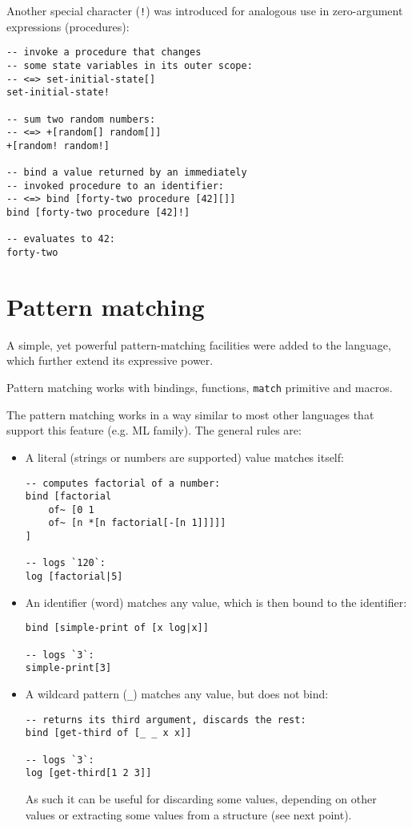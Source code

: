 Another special character (\texttt{!}) was introduced for analogous use in
zero-argument expressions (procedures):
\begin{lstlisting}
-- invoke a procedure that changes
-- some state variables in its outer scope:
-- <=> set-initial-state[]
set-initial-state!

-- sum two random numbers:
-- <=> +[random[] random[]]
+[random! random!]

-- bind a value returned by an immediately
-- invoked procedure to an identifier:
-- <=> bind [forty-two procedure [42][]]
bind [forty-two procedure [42]!]

-- evaluates to 42:
forty-two
\end{lstlisting}

\section{Pattern matching}\label{sec:pat}
A simple, yet powerful pattern-matching facilities were added to the language, which further extend its expressive power.

Pattern matching works with bindings, functions, \texttt{match} primitive and macros.

The pattern matching works in a way similar to most other languages that support
this feature (e.g. ML family). The general rules are:
\begin{itemize}
    \item A literal (strings or numbers are supported) value matches itself:
\begin{lstlisting}
-- computes factorial of a number:
bind [factorial
    of~ [0 1
    of~ [n *[n factorial[-[n 1]]]]]
]

-- logs `120`:
log [factorial|5]
\end{lstlisting}

    \item An identifier (word) matches any value, which is then bound to the
      identifier:
\begin{lstlisting}
bind [simple-print of [x log|x]]

-- logs `3`:
simple-print[3]
\end{lstlisting}

    \item A wildcard pattern (\texttt{\_}) matches any value, but does not bind:
\begin{lstlisting}
-- returns its third argument, discards the rest:
bind [get-third of [_ _ x x]]

-- logs `3`:
log [get-third[1 2 3]]
\end{lstlisting}
    As such it can be useful for discarding some values, depending on other
    values or extracting some values from a structure (see next point).
\end{itemize}

